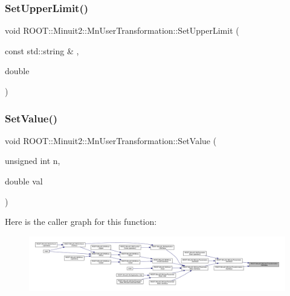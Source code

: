 \subsubsection{\texorpdfstring{SetUpperLimit()}{SetUpperLimit()}\hspace{0.1cm}{\footnotesize\ttfamily [4/4]}}
{\footnotesize\ttfamily void R\+O\+O\+T\+::\+Minuit2\+::\+Mn\+User\+Transformation\+::\+Set\+Upper\+Limit (\begin{DoxyParamCaption}\item[{const std\+::string \&}]{,  }\item[{double}]{ }\end{DoxyParamCaption})}

\mbox{\label{classROOT_1_1Minuit2_1_1MnUserTransformation_a62f598ff8d0c916c496f495440101d9c}} 
\subsubsection{\texorpdfstring{SetValue()}{SetValue()}\hspace{0.1cm}{\footnotesize\ttfamily [1/4]}}
{\footnotesize\ttfamily void R\+O\+O\+T\+::\+Minuit2\+::\+Mn\+User\+Transformation\+::\+Set\+Value (\begin{DoxyParamCaption}\item[{unsigned int}]{n,  }\item[{double}]{val }\end{DoxyParamCaption})}

Here is the caller graph for this function\+:\nopagebreak
\begin{figure}[H]
\begin{center}
\leavevmode
\includegraphics[width=350pt]{d9/d98/classROOT_1_1Minuit2_1_1MnUserTransformation_a62f598ff8d0c916c496f495440101d9c_icgraph}
\end{center}
\end{figure}
\mbox{\label{classROOT_1_1Minuit2_1_1MnUserTransformation_a62f598ff8d0c916c496f495440101d9c}} 
